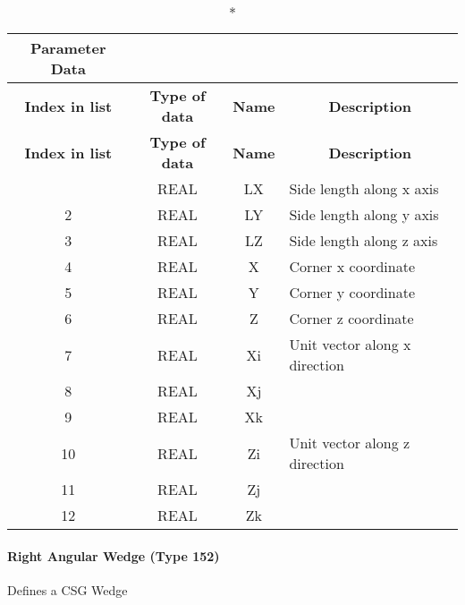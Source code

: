 \begin{longtable}[H]{|c|c|c|l|}
  \caption*{Parameter Data} \\

  \hline
  \multicolumn{1}{|c|}{\textbf{Index in list}} & \multicolumn{1}{|c|}{\textbf{Type of data}} &
  \multicolumn{1}{|c|}{\textbf{Name}} & \multicolumn{1}{|c|}{\textbf{Description}} \\ \hline
  \endfirsthead
  \hline
  
  \multicolumn{1}{|c|}{\textbf{Index in list}} & \multicolumn{1}{|c|}{\textbf{Type of data}} &
  \multicolumn{1}{|c|}{\textbf{Name}} & \multicolumn{1}{|c|}{\textbf{Description}} \\ \hline
  \endhead
  
  \endfoot

  \endlastfoot
1 & REAL & LX & Side length along x axis\\ \hline
2 & REAL & LY & Side length along y axis\\ \hline
3 & REAL & LZ & Side length along z axis\\ \hline
4 & REAL & X & Corner x coordinate\\ \hline
5 & REAL & Y & Corner y coordinate\\ \hline
6 & REAL & Z & Corner z coordinate\\ \hline
7 & REAL & Xi & Unit vector along x direction\\ \hline
8 & REAL & Xj &\\ \hline
9 & REAL & Xk &\\ \hline
10 & REAL & Zi & Unit vector along z direction\\ \hline
11 & REAL & Zj &\\ \hline
12 & REAL & Zk &\\ \hline
\end{longtable}

\paragraph{Right Angular Wedge (Type
152)}\label{right-angular-wedge-type-152}

Defines a CSG Wedge

